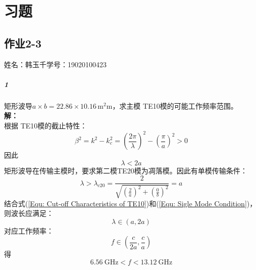 \chapter{习题}
\section{作业2-3}
\begin{center}
    姓名：韩玉千\hspace{4cm}学号：19020100423
\end{center}

    \paragraph{1}矩形波导$a\times b=22.86\times 10.16\,\si{\square\milli\metre}$，求主模 TE{\scriptsize 10}模的可能工作频率范围。
    \\{\bfseries 解：}\\
    根据 TE{\scriptsize 10}模的截止特性：
    \begin{equation*}
        \beta^2=k^2-k_c^2=(\frac{2\pi}{\lambda})^2-(\frac{\pi}{a})^2>0
    \end{equation*}
    因此
    \begin{equation}
        \lambda<2a\label{Equ: Cut-off Characteristics of TE10}
    \end{equation}
    矩形波导在传输主模时，要求第二模TE{\scriptsize 20}模为凋落模。因此有单模传输条件：
    \begin{equation}
        \lambda>\lambda_{c20}=\frac{2}{\sqrt{(\frac{2}{a})^2+(\frac{0}{b})^2}}=a\label{Equ: Sigle Mode Condition}
    \end{equation}
    结合式(\ref{Equ: Cut-off Characteristics of TE10})和(\ref{Equ: Sigle Mode Condition})，则波长应满足：
    \begin{equation*}
        \lambda\in(a,2a)
    \end{equation*}
    对应工作频率：
    \begin{equation*}
        f\in\left(\frac{c}{2a},\frac{c}{a}\right)
    \end{equation*}
    得
    \begin{equation*}
        \SI{6.56}{\giga\hertz} < f < \SI{13.12}{\giga\hertz}
    \end{equation*}


